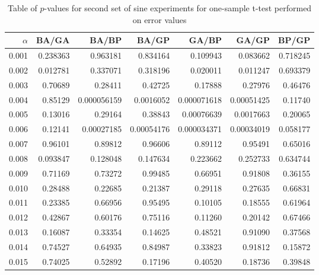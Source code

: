 \documentclass[a4paper,11pt]{article}
\begin{document}
\begin{appendices}
\begin{table}[htb]
\caption{Table of $p$-values for second set of sine experiments for one-sample t-test performed on error values} 
\begin{center}
\begin{tabular}{r|rrrrrr}
 $\alpha$  &     BA/GA  &        BA/BP  &       BA/GP  &        GA/BP  &       GA/GP  &     BP/GP  \\
\hline
    0.001  &  0.238363  &     0.963181  &    0.834164  &     0.109943  &    0.083662  &  0.718245  \\
    0.002  &  0.012781  &     0.337071  &    0.318196  &     0.020011  &    0.011247  &  0.693379  \\
    0.003  &   0.70689  &      0.28411  &     0.42725  &      0.17888  &     0.27976  &   0.46476  \\
    0.004  &   0.85129  &  0.000056159  &   0.0016052  &  0.000071618  &  0.00051425  &   0.11740  \\
    0.005  &   0.13016  &      0.29164  &     0.38843  &   0.00076639  &   0.0017663  &   0.20065  \\
    0.006  &   0.12141  &   0.00027185  &  0.00054176  &  0.000034371  &  0.00034019  &  0.058177  \\
    0.007  &   0.96101  &      0.89812  &     0.96606  &      0.89112  &     0.95491  &   0.65016  \\
    0.008  &  0.093847  &     0.128048  &    0.147634  &     0.223662  &    0.252733  &  0.634744  \\
    0.009  &   0.71169  &      0.73272  &     0.99485  &      0.66951  &     0.91808  &   0.36155  \\
    0.010  &   0.28488  &      0.22685  &     0.21387  &      0.29118  &     0.27635  &   0.66831  \\
    0.011  &   0.23385  &      0.66956  &     0.95495  &      0.10105  &     0.18555  &   0.61964  \\
    0.012  &   0.42867  &      0.60176  &     0.75116  &      0.11260  &     0.20142  &   0.67466  \\
    0.013  &   0.16087  &      0.33354  &     0.14625  &      0.48521  &     0.91090  &   0.37568  \\
    0.014  &   0.74527  &      0.64935  &     0.84987  &      0.33823  &     0.91812  &   0.15872  \\
    0.015  &   0.74025  &      0.52892  &     0.17196  &      0.40520  &     0.18736  &   0.39848  \\
\end{tabular}
\end{center}
\end{table}



\end{appendices}
\end{document}
